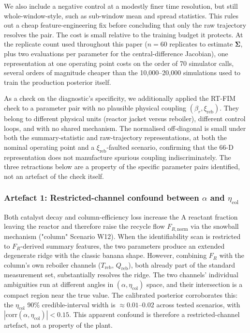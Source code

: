 \documentclass[aps,pre,twocolumn,superscriptaddress]{revtex4-2}
\begin{document}
We also include a negative control at a modestly finer time resolution, but still
whole-window-style, such as sub-window mean and spread
statistics. This rules out a cheap feature-engineering fix before concluding
that only the raw trajectory resolves the pair. The cost is small relative to
the training budget it protects. At the replicate count used throughout this
paper ($n=60$ replicates to estimate $\boldsymbol{\Sigma}$, plus two evaluations
per parameter for the central-difference Jacobian), one representation at one
operating point costs on the order of 70 simulator calls, several orders of
magnitude cheaper than the 10,000--20,000 simulations used to train the
production posterior itself.

As a check on the diagnostic's specificity, we additionally applied the
RT-FIM check to a parameter pair with no plausible physical coupling
$(\beta_r,\xi_\mathrm{reb})$. They belong to different physical units (reactor jacket
versus reboiler), different control loops, and with no shared mechanism. The
normalised off-diagonal is small under both the summary-statistic and
raw-trajectory representations, at both the nominal operating point and a
$\xi_\mathrm{reb}$-faulted scenario, confirming that the 66-D representation
does not manufacture spurious coupling indiscriminately. The three
retractions below are a property of the specific parameter pairs
identified, not an artefact of the check itself.

\subsubsection{Artefact 1: Restricted-channel confound between
  \texorpdfstring{$\alpha$}{alpha} and
  \texorpdfstring{$\eta_\mathrm{col}$}{eta_col}}
\label{sec:wu_artifact1}

Both catalyst decay and column-efficiency loss increase the A reactant fraction leaving
the reactor and therefore raise the recycle flow $F_{R,\mathrm{norm}}$ via the
snowball mechanism ("column" Scenario W12).  When the identifiability scan is restricted to
$F_R$-derived summary features, the two parameters produce an extended
degenerate ridge with the classic banana shape.  However, combining $F_R$ with
the column's own reboiler channels ($T_\mathrm{reb}$, $Q_\mathrm{reb}$),
both already part of the standard measurement set, substantially resolves
the ridge. The two channels' individual ambiguities run at different angles in
$(\alpha, \eta_\mathrm{col})$ space, and their intersection is a compact region
near the true value.  The calibrated posterior corroborates this: the
$\eta_\mathrm{col}$ 90\% credible-interval width is $\approx 0.01$--$0.02$
across tested scenarios, with $|\mathrm{corr}(\alpha, \eta_\mathrm{col})| < 0.15$.
This apparent confound is therefore a restricted-channel artefact, not a
property of the plant.
\end{document}
